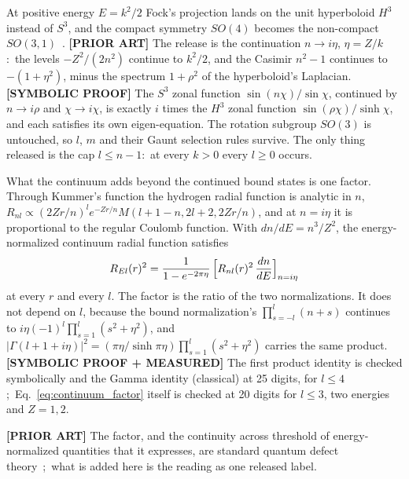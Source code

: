 \documentclass[aps,pra,twocolumn,superscriptaddress,longbibliography]{revtex4-2}
\begin{document}
At positive energy $E = k^2/2$ Fock's projection lands on the unit hyperboloid $H^3$ instead of $S^3$, and the compact symmetry $SO(4)$ becomes the non-compact $SO(3,1)$~\cite{bander1966,bander1966b}. \textbf{[PRIOR ART]} The release is the continuation $n \to i\eta$, $\eta = Z/k$:\ the levels $-Z^2/(2n^2)$ continue to $k^2/2$, and the Casimir $n^2-1$ continues to $-(1+\eta^2)$, minus the spectrum $1+\rho^2$ of the hyperboloid's Laplacian. \textbf{[SYMBOLIC PROOF]} The $S^3$ zonal function $\sin(n\chi)/\sin\chi$, continued by $n\to i\rho$ and $\chi\to i\chi$, is exactly $i$ times the $H^3$ zonal function $\sin(\rho\chi)/\sinh\chi$, and each satisfies its own eigen-equation. The rotation subgroup $SO(3)$ is untouched, so $l$, $m$ and their Gaunt selection rules survive. The only thing released is the cap $l \le n-1$:\ at every $k > 0$ every $l \ge 0$ occurs.

What the continuum adds beyond the continued bound states is one factor. Through Kummer's function the hydrogen radial function is analytic in $n$, $R_{nl} \propto (2Zr/n)^l e^{-Zr/n} M(l+1-n, 2l+2, 2Zr/n)$, and at $n = i\eta$ it is proportional to the regular Coulomb function. With $dn/dE = n^3/Z^2$, the energy-normalized continuum radial function satisfies
\begin{equation}
R_{El}(r)^2 = \frac{1}{1-e^{-2\pi\eta}}\,\Bigl[R_{nl}(r)^2\,\frac{dn}{dE}\Bigr]_{n=i\eta}
\label{eq:continuum_factor}
\end{equation}
at every $r$ and every $l$. The factor is the ratio of the two normalizations. It does not depend on $l$, because the bound normalization's $\prod_{s=-l}^{l}(n+s)$ continues to $i\eta(-1)^l\prod_{s=1}^{l}(s^2+\eta^2)$, and $|\Gamma(l+1+i\eta)|^2 = (\pi\eta/\sinh\pi\eta)\prod_{s=1}^{l}(s^2+\eta^2)$ carries the same product. \textbf{[SYMBOLIC PROOF + MEASURED]} The first product identity is checked symbolically and the Gamma identity (classical) at 25 digits, for $l \le 4$;\ Eq.~\eqref{eq:continuum_factor} itself is checked at 20 digits for $l \le 3$, two energies and $Z = 1, 2$.

\textbf{[PRIOR ART]} The factor, and the continuity across threshold of energy-normalized quantities that it expresses, are standard quantum defect theory~\cite{Seaton1983};\ what is added here is the reading as one released label.
\end{document}
